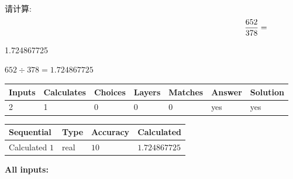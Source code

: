 \documentclass{ctexart}
\begin{document}
  
 
请计算:
\begin{equation}
\frac { %
652 }  {  %
378} = \nonumber
\end{equation}
 
 
 
\noindent{}
 
 

1.724867725
 
 
\noindent{}
 
 

 
 
 
\noindent{}
 
 

$ %
652 \div  %
378=   %
1.724867725$
 
 
\noindent{}
 
 

 
   
   
   
   
\noindent\begin{tabular}{|l|l|l|l|l|l|l|}
 \hline
Inputs & Calculates & Choices & Layers & Matches & Answer & Solution \\ \hline
 2  & 
 1  & 
 0
  & 
 0  & 
 0  & 
  yes & 
  yes 
  \\ \hline
 \end{tabular}
   
   
   
   
\noindent{}
   
   
  
  
\noindent\begin{tabular}{|l|l|l|l|}
\hline
 Sequential & Type & Accuracy & Calculated \\ 
\hline
 
 
  Calculated $  1 $ & real & $  10  $ & 
 $ 1.724867725 $ 
 \\  \hline  
 \end{tabular}
   
   
   
   
\noindent\vspace{0.1in}\hspace{-0.08in} {\textbf{\Large{All inputs: }}}
   
\end{document}
